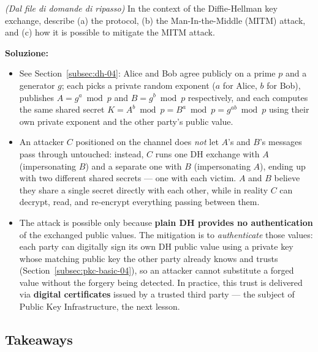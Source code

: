 \documentclass[12pt, a4paper]{article}
\newcounter{esercizio}[section]
\begin{document}
\begin{tcolorbox}[colback=lightergray!10, colframe=tocsec, title=\textbf{Esercizio \theesercizio}]
\textit{(Dal file di domande di ripasso)} In the context of the Diffie-Hellman key exchange, describe (a) the protocol, (b) the Man-In-the-Middle (MITM) attack, and (c) how it is possible to mitigate the MITM attack.
\end{tcolorbox}

\textbf{Soluzione:}
\begin{itemize}
    \item[(a)] See Section~\ref{subsec:dh-04}: Alice and Bob agree publicly on a prime $p$ and a generator $g$; each picks a private random exponent ($a$ for Alice, $b$ for Bob), publishes $A=g^a\bmod p$ and $B=g^b\bmod p$ respectively, and each computes the same shared secret $K = A^b \bmod p = B^a \bmod p = g^{ab}\bmod p$ using their own private exponent and the other party's public value.
    \item[(b)] An attacker $C$ positioned on the channel does \emph{not} let $A$'s and $B$'s messages pass through untouched: instead, $C$ runs one DH exchange with $A$ (impersonating $B$) and a separate one with $B$ (impersonating $A$), ending up with two different shared secrets --- one with each victim. $A$ and $B$ believe they share a single secret directly with each other, while in reality $C$ can decrypt, read, and re-encrypt everything passing between them.
    \item[(c)] The attack is possible only because \textbf{plain DH provides no authentication} of the exchanged public values. The mitigation is to \emph{authenticate} those values: each party can digitally sign its own DH public value using a private key whose matching public key the other party already knows and trusts (Section~\ref{subsec:pkc-basic-04}), so an attacker cannot substitute a forged value without the forgery being detected. In practice, this trust is delivered via \textbf{digital certificates} issued by a trusted third party --- the subject of Public Key Infrastructure, the next lesson.
\end{itemize}

\subsection{Takeaways}
\end{document}

